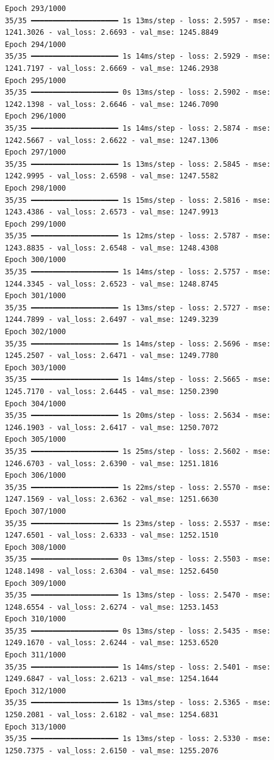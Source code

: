 \documentclass[
  letterpaper,
  DIV=11,
  numbers=noendperiod]{scrreprt}
\begin{document}
\begin{verbatim}
Epoch 293/1000
35/35 ━━━━━━━━━━━━━━━━━━━━ 1s 13ms/step - loss: 2.5957 - mse: 1241.3026 - val_loss: 2.6693 - val_mse: 1245.8849
Epoch 294/1000
35/35 ━━━━━━━━━━━━━━━━━━━━ 1s 14ms/step - loss: 2.5929 - mse: 1241.7197 - val_loss: 2.6669 - val_mse: 1246.2938
Epoch 295/1000
35/35 ━━━━━━━━━━━━━━━━━━━━ 0s 13ms/step - loss: 2.5902 - mse: 1242.1398 - val_loss: 2.6646 - val_mse: 1246.7090
Epoch 296/1000
35/35 ━━━━━━━━━━━━━━━━━━━━ 1s 14ms/step - loss: 2.5874 - mse: 1242.5667 - val_loss: 2.6622 - val_mse: 1247.1306
Epoch 297/1000
35/35 ━━━━━━━━━━━━━━━━━━━━ 1s 13ms/step - loss: 2.5845 - mse: 1242.9995 - val_loss: 2.6598 - val_mse: 1247.5582
Epoch 298/1000
35/35 ━━━━━━━━━━━━━━━━━━━━ 1s 15ms/step - loss: 2.5816 - mse: 1243.4386 - val_loss: 2.6573 - val_mse: 1247.9913
Epoch 299/1000
35/35 ━━━━━━━━━━━━━━━━━━━━ 1s 12ms/step - loss: 2.5787 - mse: 1243.8835 - val_loss: 2.6548 - val_mse: 1248.4308
Epoch 300/1000
35/35 ━━━━━━━━━━━━━━━━━━━━ 1s 14ms/step - loss: 2.5757 - mse: 1244.3345 - val_loss: 2.6523 - val_mse: 1248.8745
Epoch 301/1000
35/35 ━━━━━━━━━━━━━━━━━━━━ 1s 13ms/step - loss: 2.5727 - mse: 1244.7899 - val_loss: 2.6497 - val_mse: 1249.3239
Epoch 302/1000
35/35 ━━━━━━━━━━━━━━━━━━━━ 1s 14ms/step - loss: 2.5696 - mse: 1245.2507 - val_loss: 2.6471 - val_mse: 1249.7780
Epoch 303/1000
35/35 ━━━━━━━━━━━━━━━━━━━━ 1s 14ms/step - loss: 2.5665 - mse: 1245.7170 - val_loss: 2.6445 - val_mse: 1250.2390
Epoch 304/1000
35/35 ━━━━━━━━━━━━━━━━━━━━ 1s 20ms/step - loss: 2.5634 - mse: 1246.1903 - val_loss: 2.6417 - val_mse: 1250.7072
Epoch 305/1000
35/35 ━━━━━━━━━━━━━━━━━━━━ 1s 25ms/step - loss: 2.5602 - mse: 1246.6703 - val_loss: 2.6390 - val_mse: 1251.1816
Epoch 306/1000
35/35 ━━━━━━━━━━━━━━━━━━━━ 1s 22ms/step - loss: 2.5570 - mse: 1247.1569 - val_loss: 2.6362 - val_mse: 1251.6630
Epoch 307/1000
35/35 ━━━━━━━━━━━━━━━━━━━━ 1s 23ms/step - loss: 2.5537 - mse: 1247.6501 - val_loss: 2.6333 - val_mse: 1252.1510
Epoch 308/1000
35/35 ━━━━━━━━━━━━━━━━━━━━ 0s 13ms/step - loss: 2.5503 - mse: 1248.1498 - val_loss: 2.6304 - val_mse: 1252.6450
Epoch 309/1000
35/35 ━━━━━━━━━━━━━━━━━━━━ 1s 13ms/step - loss: 2.5470 - mse: 1248.6554 - val_loss: 2.6274 - val_mse: 1253.1453
Epoch 310/1000
35/35 ━━━━━━━━━━━━━━━━━━━━ 0s 13ms/step - loss: 2.5435 - mse: 1249.1670 - val_loss: 2.6244 - val_mse: 1253.6520
Epoch 311/1000
35/35 ━━━━━━━━━━━━━━━━━━━━ 1s 14ms/step - loss: 2.5401 - mse: 1249.6847 - val_loss: 2.6213 - val_mse: 1254.1644
Epoch 312/1000
35/35 ━━━━━━━━━━━━━━━━━━━━ 1s 13ms/step - loss: 2.5365 - mse: 1250.2081 - val_loss: 2.6182 - val_mse: 1254.6831
Epoch 313/1000
35/35 ━━━━━━━━━━━━━━━━━━━━ 1s 13ms/step - loss: 2.5330 - mse: 1250.7375 - val_loss: 2.6150 - val_mse: 1255.2076

\end{verbatim}
\end{document}
